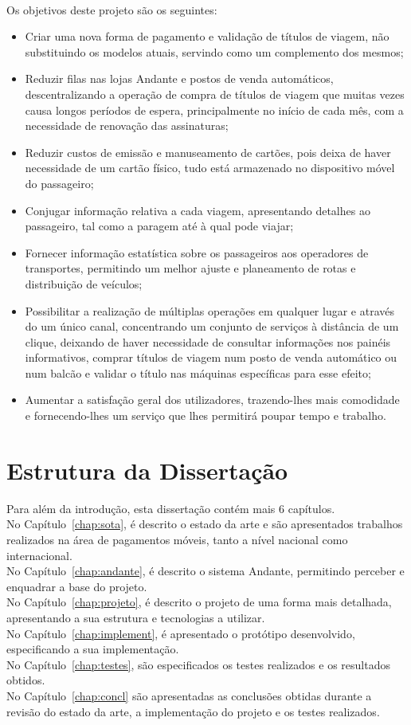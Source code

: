 ~\\Os objetivos deste projeto são os seguintes:
\begin{itemize}
\item Criar uma nova forma de pagamento e validação de títulos de viagem, não substituindo os modelos atuais, servindo como um complemento dos mesmos;
\item Reduzir filas nas lojas Andante e postos de venda automáticos, descentralizando a operação de compra de títulos de viagem que muitas vezes causa longos períodos de espera, principalmente no início de cada mês, com a necessidade de renovação das assinaturas;
\item Reduzir custos de emissão e manuseamento de cartões, pois deixa de haver necessidade de um cartão físico, tudo está armazenado no dispositivo móvel do passageiro;
\item Conjugar informação relativa a cada viagem, apresentando detalhes ao passageiro, tal como a paragem até à qual pode viajar;
\item Fornecer informação estatística sobre os passageiros aos operadores de transportes, permitindo um melhor ajuste e planeamento de rotas e distribuição de veículos;
\item Possibilitar a realização de múltiplas operações em qualquer lugar e através do um único canal, concentrando um conjunto de serviços à distância de um clique, deixando de haver necessidade de consultar informações nos painéis informativos, comprar títulos de viagem num posto de venda automático ou num balcão e validar o título nas máquinas específicas para esse efeito;
\item Aumentar a satisfação geral dos utilizadores, trazendo-lhes mais comodidade e fornecendo-lhes um serviço que lhes permitirá poupar tempo e trabalho.
\end{itemize}

\section{Estrutura da Dissertação} \label{sec:struct}

Para além da introdução, esta dissertação contém mais 6 capítulos.
\\No Capítulo~\ref{chap:sota}, é descrito o estado da arte e são apresentados trabalhos realizados na área de pagamentos móveis, tanto a nível nacional como internacional. 
\\No Capítulo~\ref{chap:andante}, é descrito o sistema Andante, permitindo perceber e enquadrar a base do projeto.
\\No Capítulo~\ref{chap:projeto}, é descrito o projeto de uma forma mais detalhada, apresentando a sua estrutura e tecnologias a utilizar.
\\No Capítulo~\ref{chap:implement}, é apresentado o protótipo desenvolvido, especificando a sua implementação.
\\No Capítulo~\ref{chap:testes}, são especificados os testes realizados e os resultados obtidos.
\\No Capítulo~\ref{chap:concl} são apresentadas as conclusões obtidas durante a revisão do estado da arte, a implementação do projeto e os testes realizados.